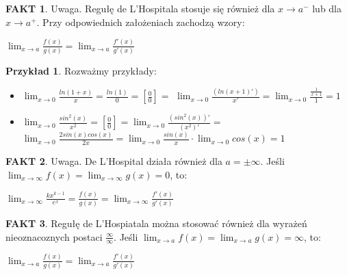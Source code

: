 \documentclass{article}
\theoremstyle{definition}
\theoremstyle{definition}
\theoremstyle{definition}
\newtheorem{pk}{Przykład}[subsection]
\theoremstyle{definition}
\newtheorem*{fakt}{FAKT}
\begin{document}
\begin{fakt}
    Uwaga. Regułę de L'Hospitala stosuje się również dla $x\rightarrow a^-$ lub dla $x\rightarrow a^+$. Przy odpowiednich założeniach zachodzą wzory:
    \begin{center}
        $\lim_{x\rightarrow a} \frac{f(x)}{g(x)} = \lim_{x\rightarrow a} \frac{f'(x)}{g'(x)}$
    \end{center}
\end{fakt}

\begin{pk}
    Rozważmy przykłady:
    \begin{itemize}
        \item $\lim_{x\rightarrow 0} \frac{ln(1+x)}{x} = \frac{ln(1)}{0} = \left[\frac{0}{0}\right]=$
        $\lim_{x\rightarrow 0} \frac{(ln(x+1)')}{x'} = \lim_{x\rightarrow 0} \frac{\frac{1}{x+1}}{1}=1$
        \item $\lim_{x\rightarrow 0} \frac{sin^2(x)}{x^2} = \left[\frac{0}{0}\right] = \lim_{x\rightarrow 0} \frac{(sin^2(x))'}{(x^2)'}=$
        $\lim_{x\rightarrow 0} \frac{2sin(x)cos(x)}{2x} = \lim_{x\rightarrow 0} \frac{sin(x)}{x}\cdot \lim_{x\rightarrow 0} cos(x) = 1$
    \end{itemize}
\end{pk}

\begin{fakt}
    Uwaga. De L'Hospital działa również dla $a=\pm\infty$. Jeśli $\lim_{x\rightarrow \infty} f(x)=\lim_{x\rightarrow\infty} g(x)=0$, to:
    \begin{center}
        $\lim_{x\rightarrow \infty} \frac{kx^{k-1}}{e^x}=\frac{f(x)}{g(x)} = \lim_{x\rightarrow \infty} \frac{f'(x)}{g'(x)}$ 
    \end{center}
\end{fakt}

\begin{fakt}
    Regułę de L'Hospiatala można stosować również dla wyrażeń nieoznacoznych postaci $\frac{\infty}{\infty}$. 
    Jeśli $\lim_{x\rightarrow a} f(x) = \lim_{x\rightarrow a } g(x) = \infty$, to:
    \begin{center}
        $\lim_{x\rightarrow a} \frac{f(x)}{g(x)}= \lim_{x\rightarrow a} \frac{f'(x)}{g'(x)}$
    \end{center}
\end{fakt}
\end{document}
